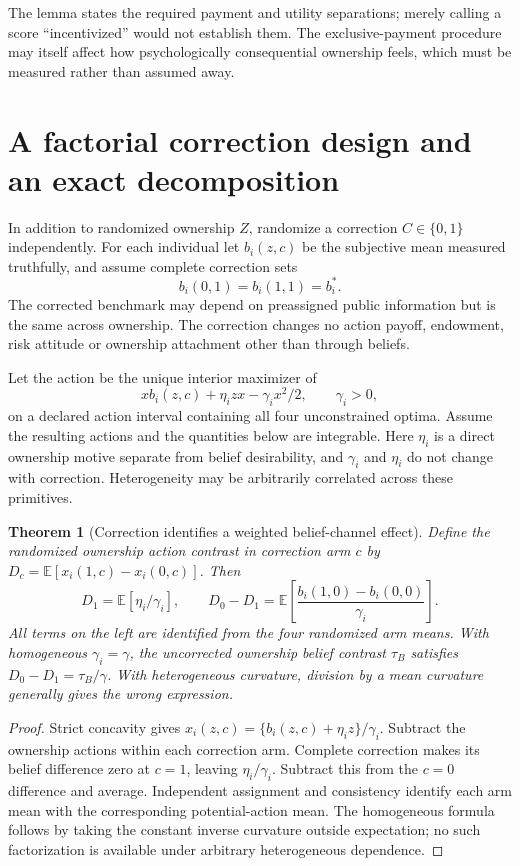\documentclass[11pt,a4paper]{article}
\newtheorem{theorem}{Theorem}[section]
\theoremstyle{definition}
\theoremstyle{remark}
\newcommand{\E}{\mathbb E}
\begin{document}
The lemma states the required payment and utility separations; merely calling a score ``incentivized'' would not establish them. The exclusive-payment procedure may itself affect how psychologically consequential ownership feels, which must be measured rather than assumed away.

\section{A factorial correction design and an exact decomposition}
In addition to randomized ownership $Z$, randomize a correction $C\in\{0,1\}$ independently. For each individual let $b_i(z,c)$ be the subjective mean measured truthfully, and assume complete correction sets
\[
 b_i(0,1)=b_i(1,1)=b_i^*.
\]
The corrected benchmark may depend on preassigned public information but is the same across ownership. The correction changes no action payoff, endowment, risk attitude or ownership attachment other than through beliefs.

Let the action be the unique interior maximizer of
\[
 xb_i(z,c)+\eta_i z x-\gamma_i x^2/2,
 \qquad\gamma_i>0,
\]
on a declared action interval containing all four unconstrained optima. Assume the resulting actions and the quantities below are integrable. Here $\eta_i$ is a direct ownership motive separate from belief desirability, and $\gamma_i$ and $\eta_i$ do not change with correction. Heterogeneity may be arbitrarily correlated across these primitives.

\begin{theorem}[Correction identifies a weighted belief-channel effect]\label{th:correction}
Define the randomized ownership action contrast in correction arm $c$ by
$D_c=\E[x_i(1,c)-x_i(0,c)]$. Then
\[
 D_1=\E[\eta_i/\gamma_i],\qquad
 D_0-D_1=\E\left[\frac{b_i(1,0)-b_i(0,0)}{\gamma_i}\right].
\]
All terms on the left are identified from the four randomized arm means. With homogeneous $\gamma_i=\gamma$, the uncorrected ownership belief contrast $\tau_B$ satisfies $D_0-D_1=\tau_B/\gamma$. With heterogeneous curvature, division by a mean curvature generally gives the wrong expression.
\end{theorem}
\begin{proof}
Strict concavity gives $x_i(z,c)=\{b_i(z,c)+\eta_i z\}/\gamma_i$. Subtract the ownership actions within each correction arm. Complete correction makes its belief difference zero at $c=1$, leaving $\eta_i/\gamma_i$. Subtract this from the $c=0$ difference and average. Independent assignment and consistency identify each arm mean with the corresponding potential-action mean. The homogeneous formula follows by taking the constant inverse curvature outside expectation; no such factorization is available under arbitrary heterogeneous dependence.
\end{proof}
\end{document}
